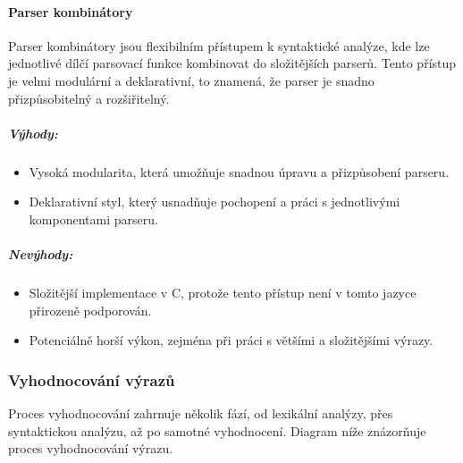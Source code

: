 \documentclass[12pt]{article} %
\begin{document}
\paragraph{Parser kombinátory}

Parser kombinátory jsou flexibilním přístupem k syntaktické analýze, kde lze jednotlivé dílčí parsovací funkce kombinovat do složitějších parserů. Tento přístup je velmi modulární a deklarativní, to znamená, že parser je snadno přizpůsobitelný a rozšiřitelný. 

\subparagraph{Výhody:}
\begin{itemize}
    \item Vysoká modularita, která umožňuje snadnou úpravu a přizpůsobení parseru.
    \item Deklarativní styl, který usnadňuje pochopení a práci s jednotlivými komponentami parseru.
\end{itemize}

\subparagraph{Nevýhody:}
\begin{itemize}
    \item Složitější implementace v C, protože tento přístup není v tomto jazyce přirozeně podporován.
    \item Potenciálně horší výkon, zejména při práci s většími a složitějšími výrazy.
\end{itemize}

\subsubsection{Vyhodnocování výrazů}

Proces vyhodnocování zahrnuje několik fází, od lexikální analýzy, přes syntaktickou analýzu, až po samotné vyhodnocení. Diagram níže znázorňuje proces vyhodnocování výrazu.
\end{document}
